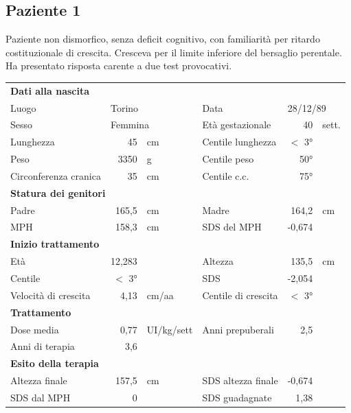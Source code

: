 \clearpage

\subsection*{Paziente 1} %

Paziente non dismorfico, senza deficit cognitivo, con familiarità per ritardo costituzionale di crescita. 
Cresceva per il limite inferiore del bersaglio perentale.
Ha presentato risposta carente a due test provocativi.

\begin{table}[!h]
\begin{tabular}{lrllrl}
\toprule
\multicolumn{6}{l}{\textbf{Dati alla nascita}}\\
Luogo 		& \multicolumn{2}{l}{Torino} 	& Data 					& \multicolumn{2}{l}{28/12/89} 	\\
Sesso 		& \multicolumn{2}{l}{Femmina} 	& Età gestazionale 		& 40 		& sett.\\
Lunghezza 	& 45 		& cm 				& Centile lunghezza		& $<$ 3° 		\\
Peso 		& 3350 		& g					& Centile peso			& 50° \\
Circonferenza cranica	& 35 		& cm 	& Centile c.c.			& 75° \\
\midrule
\multicolumn{6}{l}{\textbf{Statura dei genitori}}\\
Padre 		& 165,5 & cm 	& Madre 				& 164,2 & cm \\
MPH 		& 158,3 & cm 	& SDS del MPH 			& -0,674\\
\midrule
\multicolumn{6}{l}{\textbf{Inizio trattamento}} \\
Età	& 12,283 & 		& Altezza 				& 135,5 & cm  \\
Centile & $<$ 3° 	 &		& SDS		& -2,054 \\
Velocità di crescita & 4,13 & cm/aa	& Centile di crescita & $<$ 3°\\
\midrule
\multicolumn{6}{l}{\textbf{Trattamento}} \\
Dose media		& 0,77 & UI/kg/sett & Anni prepuberali & 2,5\\
Anni di terapia & 3,6\\
\midrule
\multicolumn{6}{l}{\textbf{Esito della terapia}} \\
Altezza finale			& 157,5 & cm 	& SDS altezza finale		& -0,674\\
SDS dal MPH				& 0 	& 		& SDS guadagnate 			& 1,38\\
\bottomrule
\end{tabular}
\end{table}
\clearpage

